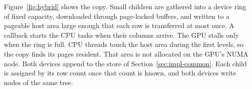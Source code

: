 Figure~\ref{fig:hybrid} shows the copy. Small children are gathered into a device ring of fixed capacity, downloaded through page-locked buffers, and written to a pageable host area large enough that each row is transferred at most once. A callback starts the CPU tasks when their columns arrive. The GPU stalls only when the ring is full. CPU threads touch the host area during the first levels, so the copy finds its pages resident. That area is not allocated on the GPU's NUMA node. Both devices append to the store of Section~\ref{sec:impl-common}. Each child is assigned by its row count once that count is known, and both devices write nodes of the same tree.
